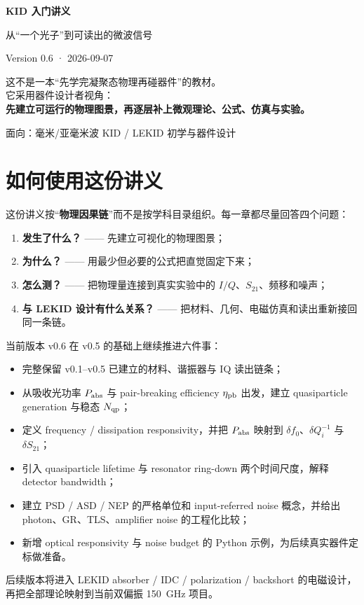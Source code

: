 \documentclass[11pt,a4paper,openany]{ctexrep}
\newcommand{\Stwentyone}{S_{21}}
\begin{document}
\begin{titlepage}
\centering
\vspace*{2.2cm}
{\fontsize{30}{38}\selectfont\bfseries\color{KidDark} KID 入门讲义}\par
\vspace{0.5cm}
{\Large\color{KidBlue} 从“一个光子”到可读出的微波信号}\par
\vspace{1.4cm}
{\large Version 0.6 · 2026-09-07}\par
\vfill
\begin{tcolorbox}[width=0.88\textwidth,colback=KidGray,colframe=KidBlue!55,arc=3mm]
\centering
\large
这不是一本“先学完凝聚态物理再碰器件”的教材。\\[0.5em]
它采用器件设计者视角：\\[0.3em]
\textbf{先建立可运行的物理图景，再逐层补上微观理论、公式、仿真与实验。}
\end{tcolorbox}
\vfill
{\large 面向：毫米/亚毫米波 KID / LEKID 初学与器件设计}\par
\end{titlepage}

\tableofcontents
\clearpage

\chapter*{如何使用这份讲义}
这份讲义按“\textbf{物理因果链}”而不是按学科目录组织。每一章都尽量回答四个问题：
\begin{enumerate}
  \item \textbf{发生了什么？} —— 先建立可视化的物理图景；
  \item \textbf{为什么？} —— 用最少但必要的公式把直觉固定下来；
  \item \textbf{怎么测？} —— 把物理量连接到真实实验中的 $I/Q$、$\Stwentyone$、频移和噪声；
  \item \textbf{与 LEKID 设计有什么关系？} —— 把材料、几何、电磁仿真和读出重新接回同一条链。
\end{enumerate}

当前版本 v0.6 在 v0.5 的基础上继续推进六件事：
\begin{itemize}
  \item 完整保留 v0.1--v0.5 已建立的材料、谐振器与 IQ 读出链条；
  \item 从吸收光功率 $P_{\rm abs}$ 与 pair-breaking efficiency $\eta_{\rm pb}$ 出发，建立 quasiparticle generation 与稳态 $N_{\rm qp}$；
  \item 定义 frequency / dissipation responsivity，并把 $P_{\rm abs}$ 映射到 $\delta f_0$、$\delta Q_i^{-1}$ 与 $\delta S_{21}$；
  \item 引入 quasiparticle lifetime 与 resonator ring-down 两个时间尺度，解释 detector bandwidth；
  \item 建立 PSD / ASD / NEP 的严格单位和 input-referred noise 概念，并给出 photon、GR、TLS、amplifier noise 的工程化比较；
  \item 新增 optical responsivity 与 noise budget 的 Python 示例，为后续真实器件定标做准备。
\end{itemize}
后续版本将进入 LEKID absorber / IDC / polarization / backshort 的电磁设计，再把全部理论映射到当前双偏振 \SI{150}{GHz} 项目。
\end{document}
